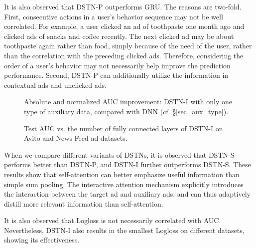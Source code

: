 \documentclass[sigconf]{acmart}
\begin{document}
It is also observed that DSTN-P outperforms GRU. The reasons are two-fold. First, consecutive actions in a user's behavior sequence may not be well correlated. For example, a user clicked an ad of toothpaste one month ago and clicked ads of snacks and coffee recently. The next clicked ad may be about toothpaste again rather than food, simply because of the need of the user, rather than the correlation with the preceding clicked ads. Therefore, considering the order of a user's behavior may not necessarily help improve the prediction performance. Second, DSTN-P can additionally utilize the information in contextual ads and unclicked ads.

\begin{figure}[!t]
\centering
{}
\vskip -8pt
\caption{Absolute and normalized AUC improvement: DSTN-I with only one type of auxiliary data, compared with DNN (cf. \S\ref{sec_aux_type}).}
\vskip -8pt
\label{auc_imp}
\end{figure}

\begin{figure}[!t]
\centering
{}
\vskip -8pt
\caption{Test AUC vs. the number of fully connected layers of DSTN-I on Avito and News Feed ad datasets.}
\vskip -8pt
\label{n_layer}
\end{figure}

When we compare different variants of DSTNs, it is observed that DSTN-S performs better than DSTN-P, and DSTN-I further outperforms DSTN-S. These results show that self-attention can better emphasize useful information than simple sum pooling. The interactive attention mechanism explicitly introduces the interaction between the target ad and auxiliary ads, and can thus adaptively distill more relevant information than self-attention.

It is also observed that Logloss is not necessarily correlated with AUC. Nevertheless, DSTN-I also results in the smallest Logloss on different datasets, showing its effectiveness.
\end{document}
